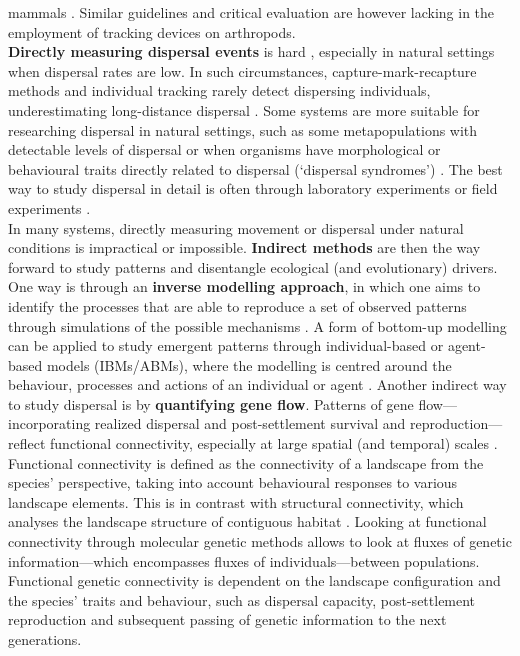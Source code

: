 \documentclass[10pt, twoside]{book} %
\begin{document}
mammals \citep{wilson2006, casper2009, omara2014, kays2015}. Similar guidelines and critical evaluation are however lacking in the employment of tracking devices on arthropods.\\
	
	\textbf{Directly measuring dispersal events} is hard \citep{duputie2013}, especially in natural settings when dispersal rates are low. In such circumstances, capture-mark-recapture methods and individual tracking rarely detect dispersing individuals, underestimating long-distance dispersal \citep{hassall2012, ugelvig2012, trense2021}. Some systems are more suitable for researching dispersal in natural settings, such as some metapopulations with detectable levels of dispersal \citep[e.g.][]{schtickzelle2006} or when organisms have morphological or behavioural traits directly related to dispersal (`dispersal syndromes') \citep{bonte2003, stevens2013}. The best way to study dispersal in detail is often through laboratory experiments \citep[e.g.][]{dahirel2019} or field experiments \citep[e.g.][]{leitch2021}.\\
	
	In many systems, directly measuring movement or dispersal under natural conditions is impractical or impossible. \textbf{Indirect methods} are then the way forward to study patterns and disentangle ecological (and evolutionary) drivers. One way is through an \textbf{inverse modelling approach}, in which one aims to identify the processes that are able to reproduce a set of observed patterns through simulations of the possible mechanisms \citep{banks2019, curtsdotter2019, stouffer2019}. A form of bottom-up modelling can be applied to study emergent patterns through individual-based or agent-based models (IBMs/ABMs), where the modelling is centred around the behaviour, processes and actions of an individual or agent \citep{deangelis2014}. Another indirect way to study dispersal is by \textbf{quantifying gene flow}. Patterns of gene flow---incorporating realized dispersal and post-settlement survival and reproduction---reflect functional connectivity, especially at large spatial (and temporal) scales \citep{spear2010, kim2013}. Functional connectivity is defined as the connectivity of a landscape from the species' perspective, taking into account behavioural responses to various landscape elements. This is in contrast with structural connectivity, which analyses the landscape structure of contiguous habitat \citep{tischendorf2000}. Looking at functional connectivity through molecular genetic methods allows to look at fluxes of genetic information---which encompasses fluxes of individuals---between populations. Functional genetic connectivity is dependent on the landscape configuration and the species' traits and behaviour, such as dispersal capacity, post-settlement reproduction and subsequent passing of genetic information to the next generations.\\
	
\end{document}
